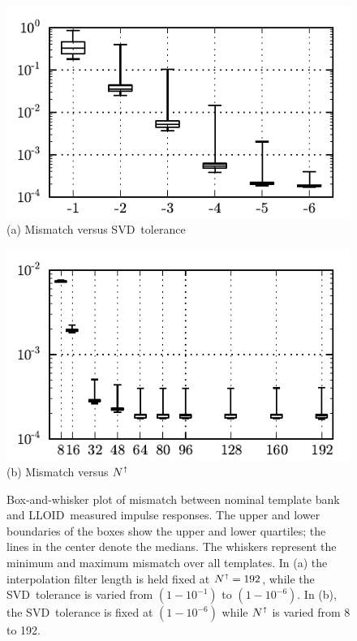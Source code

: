 \documentclass[preprint2]{aastex}
\newcommand{\SVD}{SVD}%
\newcommand{\lloid}{LLOID}%
\begin{document}
\begin{figure}[b]
	\begin{minipage}[t]{0.5\textwidth}
		\begin{center}
			\includegraphics{figures/bw}
			(a) Mismatch versus \SVD\ tolerance
		\end{center}
	\end{minipage}
	\begin{minipage}[t]{0.5\textwidth}
		\begin{center}
			\includegraphics{figures/bw_resample}
			(b) Mismatch versus $N^\shortuparrow$
		\end{center}
	\end{minipage}
	\caption{\label{fig:bw}Box-and-whisker plot of mismatch between nominal
template bank and \lloid\ measured impulse responses.  The upper and lower boundaries of
the boxes show the upper and lower quartiles; the lines in the center denote the medians.
The whiskers represent the minimum and maximum mismatch over all templates.  In 
(a) the interpolation filter length is held fixed at $N^\shortuparrow = 192$, while
the \SVD\ tolerance is varied from $\left(1-10^{-1}\right)$ to $\left(1-10^{-6}\right)$.
In (b), the \SVD\ tolerance is fixed at $\left(1-10^{-6}\right)$ while $N^\shortuparrow$
is varied from 8 to 192.}
\end{figure}
\end{document}
